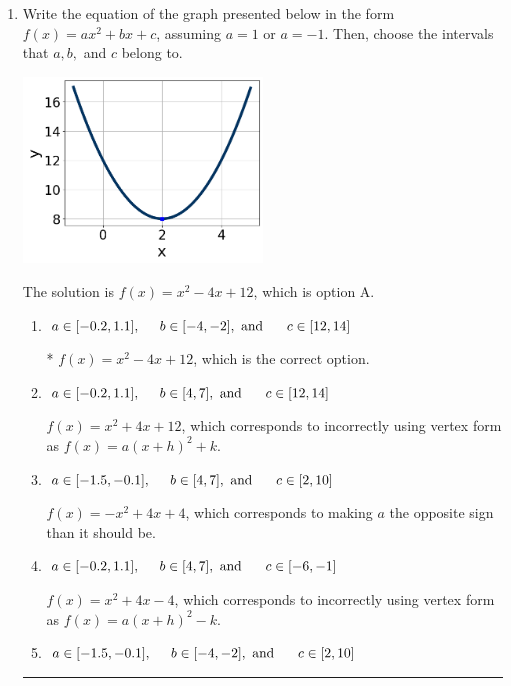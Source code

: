 \documentclass{extbook}[14pt]
\newcommand{\litem}[1]{\item #1

\rule{\textwidth}{0.4pt}}
\begin{document}
\begin{enumerate}\litem{
Write the equation of the graph presented below in the form $f(x)=ax^2+bx+c$, assuming  $a=1$ or $a=-1$. Then, choose the intervals that $a, b,$ and $c$ belong to.

\begin{center}
    \includegraphics[width=0.5\textwidth]{../Figures/quadraticGraphToEquationCopyB.png}
\end{center}




The solution is \( f(x) = x^{2} -4 x + 12 \), which is option A.\begin{enumerate}[label=\Alph*.]
\item \( a \in [-0.2, 1.1], \hspace*{5mm} b \in [-4, -2], \text{ and } \hspace*{5mm} c \in [12, 14] \)

* $f(x)=x^{2} -4 x + 12$, which is the correct option.
\item \( a \in [-0.2, 1.1], \hspace*{5mm} b \in [4, 7], \text{ and } \hspace*{5mm} c \in [12, 14] \)

$f(x)=x^{2} +4 x + 12$, which corresponds to incorrectly using vertex form as $f(x) = a(x+h)^2+k$.
\item \( a \in [-1.5, -0.1], \hspace*{5mm} b \in [4, 7], \text{ and } \hspace*{5mm} c \in [2, 10] \)

$f(x)=-x^{2} +4 x + 4$, which corresponds to making $a$ the opposite sign than it should be.
\item \( a \in [-0.2, 1.1], \hspace*{5mm} b \in [4, 7], \text{ and } \hspace*{5mm} c \in [-6, -1] \)

$f(x)=x^{2} +4 x -4$, which corresponds to incorrectly using vertex form as $f(x) = a(x+h)^2 - k$.
\item \( a \in [-1.5, -0.1], \hspace*{5mm} b \in [-4, -2], \text{ and } \hspace*{5mm} c \in [2, 10] \)


\end{enumerate}}
\end{enumerate}
\end{document}
